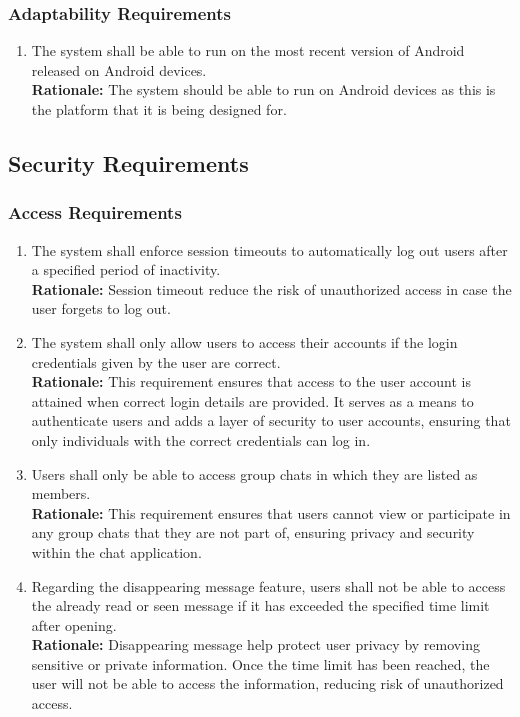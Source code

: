 \documentclass[]{article}
\begin{document}
\subsubsection{Adaptability Requirements}
\label{ssub:adaptability_requirements}
\begin{enumerate}[{MS-A}1. ]
    \item The system shall be able to run on the most recent version of Android released on Android devices. \\
    {\bf Rationale:} The system should be able to run on Android devices as this is the platform that it is being designed for.
\end{enumerate}


\subsection{Security Requirements}
\label{sub:security_requirements}
\subsubsection{Access Requirements}
\label{ssub:access_requirements}
\begin{enumerate}[{SR-AC}1. ]
    \item The system shall enforce session timeouts to automatically log out users after a specified period of inactivity. \\
    {\bf Rationale:} Session timeout reduce the risk of unauthorized access in case the user forgets to log out.
    \item The system shall only allow users to access their accounts if the login credentials given by the user are correct. \\
    {\bf Rationale:} This requirement ensures that access to the user account is attained when correct login details are provided. 
    It serves as a means to authenticate users and adds a layer of security to user accounts, ensuring that only individuals with the 
    correct credentials can log in.
    \item Users shall only be able to access group chats in which they are listed as members. \\
    {\bf Rationale:} This requirement ensures that users cannot view or participate in any group chats that 
    they are not part of, ensuring privacy and security within the chat application.
    \item Regarding the disappearing message feature, users shall not be able to access the already read or seen message if it has exceeded the specified time limit
    after opening. \\
    {\bf Rationale:} Disappearing message help protect user privacy by removing sensitive or private information.
    Once the time limit has been reached, the user will not be able to access the information, reducing risk
    of unauthorized access.
\end{enumerate}
\end{document}
